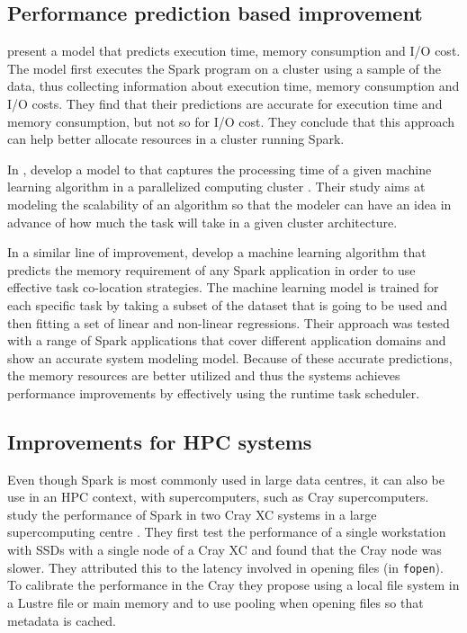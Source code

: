 \documentclass{article}
\begin{document}
\subsection{Performance prediction based improvement}

\citeauthor{wang2015performance} \cite{wang2015performance} present a model that predicts execution time, memory consumption and I/O cost. The model first executes the Spark program on a cluster using a sample of the data, thus collecting information about execution time, memory consumption and I/O costs. They find that their predictions are accurate for execution time and memory consumption, but not so for I/O cost. They conclude that this approach can help better allocate resources in a cluster running Spark.

In \citeyear{Ulanov2017}, \citeauthor{Ulanov2017} develop a model to that captures the processing time of a given machine learning algorithm in a parallelized computing cluster \cite{Ulanov2017}. Their study aims at modeling the scalability of an algorithm so that the modeler can have an idea in advance of how much the task will take in a given cluster architecture.

In a similar line of improvement, \citeauthor{Marco2017} \cite{Marco2017} develop a machine learning algorithm that predicts the memory requirement of any Spark application in order to use effective task co-location strategies. The machine learning model is trained for each specific task by taking a subset of the dataset that is going to be used and then fitting a set of linear and non-linear regressions. Their approach was tested with a range of Spark applications that cover different application domains and show an accurate system modeling model. Because of these accurate predictions, the memory resources are better utilized and thus the systems achieves performance improvements by effectively using the runtime task scheduler.

\subsection{Improvements for HPC systems}

Even though Spark is most commonly used in large data centres, it can also be use in an HPC context, with supercomputers, such as Cray supercomputers. \citeauthor{Chaimov2016} study the performance of Spark in two Cray XC systems in a large supercomputing centre \cite{Chaimov2016}. They first test the performance of a single workstation with SSDs with a single node of a Cray XC and found that the Cray node was slower. They attributed this to the latency involved in opening files (in \texttt{fopen}). To calibrate the performance in the Cray they propose using a local file system in a Lustre file or main memory and to use pooling when opening files so that metadata is cached.
\end{document}
